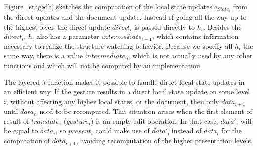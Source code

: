 \documentclass[twoside,epsf]{report}
\begin{document}
Figure~\ref{stagedh} sketches the computation of the local state updates $e_{State_i}$ from the direct updates and the document update. Instead of going all the way up to the highest level, the direct update $direct_i$ is passed directly to $h_i$. Besides the $direct_i$, $h_i$ also has a parameter $intermediate_{i-1}$, which contains information necessary to realize the structure watching behavior.  Because we specify all $h_i$ the same way, there is a value $intermediate_n$, which is not actually used by any other functions and which will not be computed by an implementation.

The layered $h$ function makes it possible to handle direct local state updates in an efficient way. If the gesture results in a direct local state update on some level $i$, without affecting any higher local states, or the document, then only $data_{i+1}$ until $data_n$ need to be recomputed. This situation arises when the first element of result of $translate_i$ ($gesture_i$) is an empty edit operation. In that case, $data'_i$ will be equal to $data_i$, so $present_i$ could make use of $data'_i$ instead of $data_i$ for the computation of $data_{i+1}$, avoiding recomputation of the higher presentation levels. 
\end{document}
